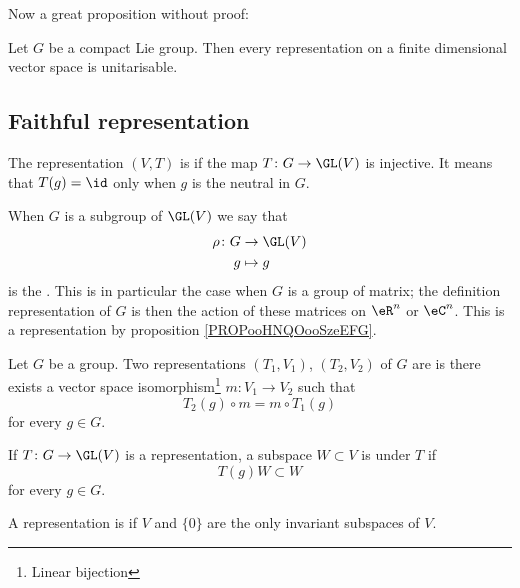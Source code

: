 Now a great proposition without proof:

\begin{proposition}     \label{PROPooCFRGooZBBype}
    Let $G$ be a compact Lie group. Then every representation on a finite dimensional vector space is unitarisable.
\end{proposition}

\subsection{Faithful representation}

\begin{definition}      \label{DEFooAFSAooGDSDBb}
    The representation \( (V,T)\) is  if the map \( T\colon G\to \GL(V)\) is injective. It means that \( T(g)=\id\) only when \( g\) is the neutral in \( G\).
\end{definition}

When \( G\) is a subgroup of \( \GL(V)\) we say that
\begin{equation}
    \begin{aligned}
        \rho\colon G&\to \GL(V) \\
        g&\mapsto g 
    \end{aligned}
\end{equation}
is the . This is in particular the case when \( G\) is a group of matrix; the definition representation of \( G\) is then the action of these matrices on \( \eR^n\) or \( \eC^n\). This is a representation by proposition \ref{PROPooHNQOooSzeEFG}.

\begin{definition}
    Let \( G\) be a group. Two representations \( (T_1,V_1)\), \( (T_2,V_2)\) of \( G\) are  is there exists a vector space isomorphism\footnote{Linear bijection} \( m\colon V_1\to V_2\) such that
    \begin{equation}
        T_2(g)\circ m=m\circ T_1(g)
    \end{equation}
    for every \( g\in G\).
\end{definition}

\begin{definition}
    If \( T\colon G\to \GL(V)\) is a representation, a subspace \( W\subset V\) is  under \( T\) if
    \begin{equation}
        T(g)W\subset W
    \end{equation}
    for every \( g\in G\).

    A representation is  if \( V\) and \( \{ 0 \}\) are the only invariant subspaces of \( V\).
\end{definition}


